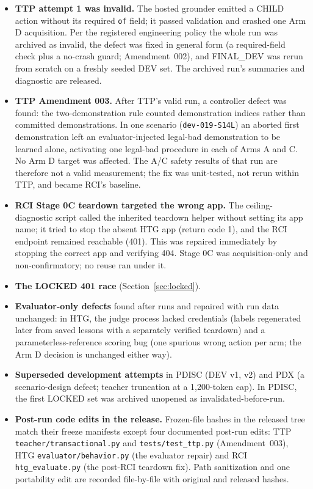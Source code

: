 \documentclass[10pt]{article}
\newcommand{\id}[1]{\nolinkurl{#1}}
\begin{document}
\begin{itemize}
\item \textbf{TTP attempt 1 was invalid.} The hosted grounder emitted a CHILD action without its required \id{of} field; it passed validation and crashed one Arm D acquisition. Per the registered engineering policy the whole run was archived as invalid, the defect was fixed in general form (a required-field check plus a no-crash guard; Amendment~002), and FINAL\_DEV was rerun from scratch on a freshly seeded DEV set. The archived run's summaries and diagnostic are released.
\item \textbf{TTP Amendment 003.} After TTP's valid run, a controller defect was found: the two-demonstration rule counted demonstration indices rather than committed demonstrations. In one scenario (\id{dev-019-S14L}) an aborted first demonstration left an evaluator-injected legal-bad demonstration to be learned alone, activating one legal-bad procedure in each of Arms A and C. No Arm D target was affected. The A/C safety results of that run are therefore not a valid measurement; the fix was unit-tested, not rerun within TTP, and became RCI's baseline.
\item \textbf{RCI Stage 0C teardown targeted the wrong app.} The ceiling-diagnostic script called the inherited teardown helper without setting its app name; it tried to stop the absent HTG app (return code 1), and the RCI endpoint remained reachable (401). This was repaired immediately by stopping the correct app and verifying 404. Stage 0C was acquisition-only and non-confirmatory; no reuse ran under it.
\item \textbf{The LOCKED 401 race} (Section~\ref{sec:locked}).
\item \textbf{Evaluator-only defects} found after runs and repaired with run data unchanged: in HTG, the judge process lacked credentials (labels regenerated later from saved lessons with a separately verified teardown) and a parameterless-reference scoring bug (one spurious wrong action per arm; the Arm D decision is unchanged either way).
\item \textbf{Superseded development attempts} in PDISC (DEV v1, v2) and PDX (a scenario-design defect; teacher truncation at a 1{,}200-token cap). In PDISC, the first LOCKED set was archived unopened as invalidated-before-run.
\item \textbf{Post-run code edits in the release.} Frozen-file hashes in the released tree match their freeze manifests except four documented post-run edits: TTP \id{teacher/transactional.py} and \id{tests/test_ttp.py} (Amendment~003), HTG \id{evaluator/behavior.py} (the evaluator repair) and RCI \id{htg_evaluate.py} (the post-RCI teardown fix). Path sanitization and one portability edit are recorded file-by-file with original and released hashes.
\end{itemize}
\end{document}

